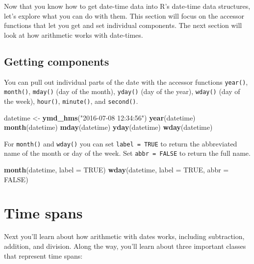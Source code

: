 \documentclass[]{book}
\newenvironment{Shaded}{\begin{snugshade}}{\end{snugshade}}
\newcommand{\KeywordTok}[1]{\textcolor[rgb]{0.13,0.29,0.53}{\textbf{#1}}}
\newcommand{\DataTypeTok}[1]{\textcolor[rgb]{0.13,0.29,0.53}{#1}}
\newcommand{\StringTok}[1]{\textcolor[rgb]{0.31,0.60,0.02}{#1}}
\newcommand{\OtherTok}[1]{\textcolor[rgb]{0.56,0.35,0.01}{#1}}
\newcommand{\NormalTok}[1]{#1}
\begin{document}
Now that you know how to get date-time data into R's date-time data
structures, let's explore what you can do with them. This section will
focus on the accessor functions that let you get and set individual
components. The next section will look at how arithmetic works with
date-times.

\subsection{Getting components}\label{getting-components}

You can pull out individual parts of the date with the accessor
functions \texttt{year()}, \texttt{month()}, \texttt{mday()} (day of the
month), \texttt{yday()} (day of the year), \texttt{wday()} (day of the
week), \texttt{hour()}, \texttt{minute()}, and \texttt{second()}.

\begin{Shaded}
\begin{Highlighting}[]
\NormalTok{datetime <-}\StringTok{ }\KeywordTok{ymd_hms}\NormalTok{(}\StringTok{"2016-07-08 12:34:56"}\NormalTok{)}
\KeywordTok{year}\NormalTok{(datetime)}
\KeywordTok{month}\NormalTok{(datetime)}
\KeywordTok{mday}\NormalTok{(datetime)}
\KeywordTok{yday}\NormalTok{(datetime)}
\KeywordTok{wday}\NormalTok{(datetime)}
\end{Highlighting}
\end{Shaded}

For \texttt{month()} and \texttt{wday()} you can set
\texttt{label\ =\ TRUE} to return the abbreviated name of the month or
day of the week. Set \texttt{abbr\ =\ FALSE} to return the full name.

\begin{Shaded}
\begin{Highlighting}[]
\KeywordTok{month}\NormalTok{(datetime, }\DataTypeTok{label =} \OtherTok{TRUE}\NormalTok{)}
\KeywordTok{wday}\NormalTok{(datetime, }\DataTypeTok{label =} \OtherTok{TRUE}\NormalTok{, }\DataTypeTok{abbr =} \OtherTok{FALSE}\NormalTok{)}
\end{Highlighting}
\end{Shaded}

\section{Time spans}\label{time-spans}

Next you'll learn about how arithmetic with dates works, including
subtraction, addition, and division. Along the way, you'll learn about
three important classes that represent time spans:
\end{document}
